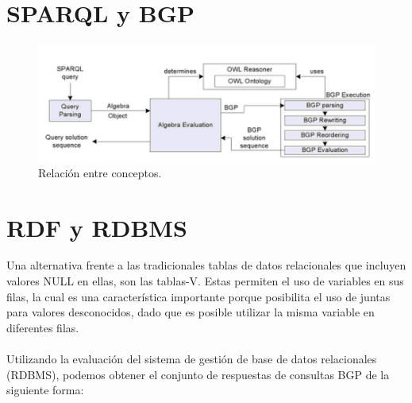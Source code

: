\documentclass[10pt,a4paper]{article}
\begin{document}
\section{SPARQL y BGP}

\begin{figure}[H] %
\begin{center}
\includegraphics[width=400pt]{./imgs/conceptos.png}
\caption{Relación entre conceptos.}
\end{center}
\end{figure}

\section{RDF y RDBMS}
Una alternativa frente a las tradicionales tablas de datos relacionales que incluyen valores NULL en ellas, son las tablas-V. Estas permiten el uso de variables en sus filas, la cual es una característica importante porque posibilita el uso de juntas para valores desconocidos, dado que es posible utilizar la misma variable en diferentes filas.
\\\\
Utilizando la evaluación del sistema de gestión de base de datos relacionales (RDBMS), podemos obtener el conjunto de respuestas de consultas BGP de la siguiente forma:
\end{document}
